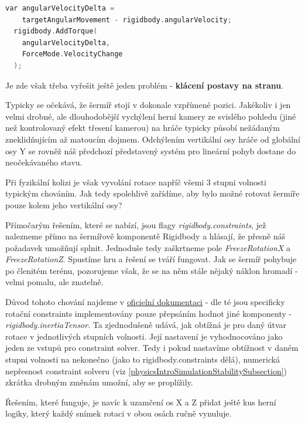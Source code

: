 \begin{lstlisting}[language=C, basicstyle=\fontsize{11}{13}\selectfont\ttfamily]
  var angularVelocityDelta = 
    targetAngularMovement - rigidbody.angularVelocity;
  rigidbody.AddTorque(
    angularVelocityDelta,
    ForceMode.VelocityChange
  );
\end{lstlisting}

Je zde však třeba vyřešit ještě jeden problém - \textbf{klácení postavy na stranu}. 

Typicky se očekává, že šermíř stojí v dokonale vzpřímené pozici. Jakékoliv i jen velmi drobné, ale dlouhodobější vychýlení herní kamery ze svislého pohledu (jiné než kontrolovaný efekt třesení kamerou) na hráče typicky působí nežádaným zneklidňujícím až matoucím dojmem. Odchýlením vertikální osy hráče od globální osy Y se rovněž náš předchozí představený systém pro lineární pohyb dostane do neočekávaného stavu. 

Při fyzikální kolizi je však vyvolání rotace napříč všemi 3 stupni volnosti typickým chováním. Jak tedy spolehlivě zařídíme, aby bylo možné rotovat šermíře pouze kolem jeho vertikální osy?

Přímočarým řešením, které se nabízí, jsou flagy \textit{rigidbody.constraints}, jež nalezneme přímo na šermířově komponentě Rigidbody a hlásají, že přesně náš požadavek umožňují splnit. Jednoduše tedy zaškrtneme pole \textit{FreezeRotationX} a \textit{FreezeRotationZ}. Spustíme hru a řešení se tváří fungovat. Jak se šermíř pohybuje po členitém terénu, pozorujeme však, že se na něm stále nějaký náklon hromadí - velmi pomalu, ale znatelně.

Důvod tohoto chování najdeme v \href{https://docs.unity3d.com/2022.2/Documentation/ScriptReference/Rigidbody-inertiaTensor.html}{\underline{oficielní dokumentaci}} \cite{Unity} - dle té jsou specificky rotační constraints implementovány pouze přepsáním hodnot jiné komponenty - \textit{rigidbody.inertiaTensor}. Ta zjednodušeně udává, jak obtížná je pro daný útvar rotace v jednotlivých stupních volnosti. Její nastavení je vyhodnocováno jako jeden ze vstupů pro constraint solver. Tedy i pokud nastavíme obtížnost v daném stupni volnosti na nekonečno (jako to rigidbody.constraints dělá), numerická nepřesnost constraint solveru (viz \ref{physicsIntroSimulationStabilitySubsection}) zkrátka drobným změnám umožní, aby se proplížily.

Řešením, které funguje, je navíc k uzamčení os X a Z přidat ještě kus herní logiky, který každý snímek rotaci v obou osách ručně vynuluje.

